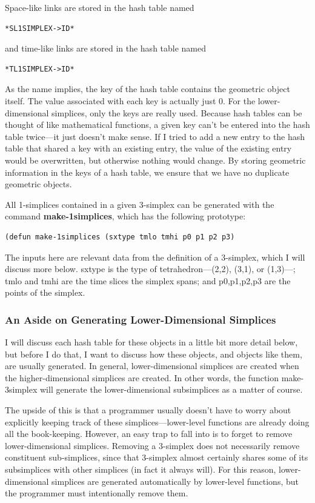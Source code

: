\message{ !name(programmers_guide.tex)}\documentclass[12pt]{article}
\begin{document}
Space-like links are stored in the hash table named
\begin{lstlisting}
*SL1SIMPLEX->ID*
\end{lstlisting}
and time-like links are stored in the hash table named
\begin{lstlisting}
*TL1SIMPLEX->ID*
\end{lstlisting}

As the name implies, the key of the hash table contains the geometric
object itself. The value associated with each key is actually just
0. For the lower-dimensional simplices, only the keys are really
used. Because hash tables can be thought of like mathematical
functions, a given key can't be entered into the hash table twice---it
just doesn't make sense. If I tried to add a new entry to the hash
table that shared a key with an existing entry, the value of the
existing entry would be overwritten, but otherwise nothing would
change. By storing geometric information in the keys of a hash table,
we ensure that we have no duplicate geometric objects.

All 1-simplices contained in a given 3-simplex can be generated with
the command \textbf{make-1simplices}, which has the following prototype:
\begin{lstlisting}
(defun make-1simplices (sxtype tmlo tmhi p0 p1 p2 p3)
\end{lstlisting}
The inputs here are relevant data from the definition of a 3-simplex,
which I will discuss more below. sxtype is the type of
tetrahedron---(2,2), (3,1), or (1,3)---; tmlo and tmhi are the time
slices the simplex spans; and p0,p1,p2,p3 are the points of the
simplex.

\subsubsection{An Aside on Generating Lower-Dimensional Simplices}
I will discuss each hash table for these objects in a little bit more
detail below, but before I do that, I want to discuss how these
objects, and objects like them, are usually generated. In general,
lower-dimensional simplices are created when the higher-dimensional
simplices are created. In other words, the function make-3simplex will
generate the lower-dimensional subsimplices as a matter of course.

The upside of this is that a programmer usually doesn't have to worry
about explicitly keeping track of these simplices---lower-level
functions are already doing all the book-keeping. However, an easy
trap to fall into is to forget to remove lower-dimensional
simplices. Removing a 3-simplex does not necessarily remove
constituent sub-simplices, since that 3-simplex almost certainly
shares some of its subsimplices with other simplices (in fact it
always will). For this reason, lower-dimensional simplices are
generated automatically by lower-level functions, but the programmer
must intentionally remove them.
\end{document}
